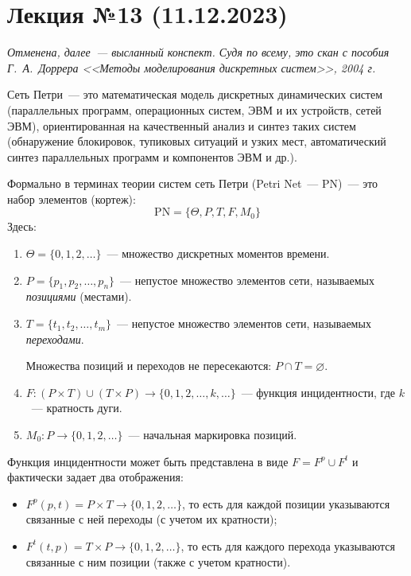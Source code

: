 \section{Лекция №13 (11.12.2023)}

\textit{Отменена, далее~--- высланный конспект. Судя по всему, это скан с пособия Г.~А.~Доррера <<Методы моделирования дискретных систем>>, 2004 г.}

\begin{dd}
    Сеть Петри~--- это математическая модель дискретных динамических систем (параллельных программ, операционных систем, ЭВМ и их устройств, сетей ЭВМ), ориентированная на качественный анализ и синтез таких систем (обнаружение блокировок, тупиковых ситуаций и узких мест, автоматический синтез параллельных программ и компонентов ЭВМ и др.).
\end{dd}

Формально в терминах теории систем сеть Петри (Petri Net~--- PN)~--- это набор элементов (кортеж):
%
\begin{equation*}
    \text{PN} = \{ \Theta, P, T, F, M_0 \}
\end{equation*}
%
Здесь:

\begin{enumerate}
    \item ${\Theta = \{ 0, 1, 2, \dots \}}$~--- множество дискретных моментов времени.
    \item ${P = \{ p_1, p_2, \dots, p_n \}}$~--- непустое множество элементов сети, называемых \textit{позициями} (местами).
    \item ${T = \{ t_1, t_2, \dots, t_m \}}$~--- непустое множество элементов сети, называемых \textit{переходами}.

          Множества позиций и переходов не пересекаются: ${ P\cap T = \varnothing }$.

    \item ${F\colon (P\times T)\cup(T\times P)\rightarrow \{ 0, 1, 2, \dots, k, \dots \}}$~--- функция инцидентности, где $k$~--- кратность дуги.
    \item ${M_0\colon P\rightarrow \{ 0, 1, 2, \dots \}}$~--- начальная маркировка позиций.
\end{enumerate}

Функция инцидентности может быть представлена в виде ${F = F^p\cup F^t}$ и фактически задает два отображения:

\begin{itemize}
    \item ${F^p(p, t) = P\times T\rightarrow \{ 0, 1, 2, \dots \}}$, то есть для каждой позиции указываются связанные с ней переходы (с учетом их кратности);
    \item ${F^t(t, p) = T\times P\rightarrow \{ 0, 1, 2, \dots \}}$, то есть для каждого перехода указываются связанные с ним позиции (также с учетом кратности).
\end{itemize}

